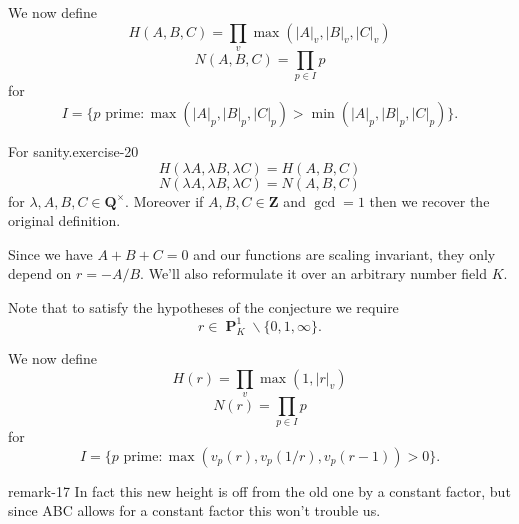 \documentclass[10pt,]{book}
\numberwithin{equation}{section}
\newcommand{\units}{^{\times}}
\newcommand{\ZZ}{\mathbf{Z}}
\newcommand{\QQ}{\mathbf{Q}}
\DeclareMathOperator{\PP}{\mathbf{P}}
\newcommand{\gt}{>}
\begin{document}
\par
\hypertarget{p-674}{}%
We now define%
\begin{equation*}
H(A,B,C) = \prod_{v}\max(|A|_v,|B|_v,|C|_v)
\end{equation*}
%
\begin{equation*}
N(A,B,C) =  \prod_{p\in I} p
\end{equation*}
for%
\begin{equation*}
I = \{p \text{ prime} : \max(|A|_p,|B|_p,|C|_p) \gt \min(|A|_p,|B|_p,|C|_p)\}\text{.}
\end{equation*}
%
\begin{inlineexercise}{For sanity.}{exercise-20}%
\hypertarget{p-675}{}%
%
\begin{equation*}
H(\lambda A,\lambda B,\lambda C)  = H(A,B,C)
\end{equation*}
%
\begin{equation*}
N(\lambda A,\lambda B,\lambda C)  = N(A,B,C)
\end{equation*}
for \(\lambda, A,B,C \in \QQ\units\). Moreover if \(A,B,C \in \ZZ\) and \(\gcd = 1\) then we recover the original definition.%
\end{inlineexercise}
\hypertarget{p-676}{}%
Since we have \(A+ B+C = 0\) and our functions are scaling invariant, they only depend on \(r=  - A/B\). We'll also reformulate it over an arbitrary number field \(K\).%
\par
\hypertarget{p-677}{}%
Note that to satisfy the hypotheses of the conjecture we require%
\begin{equation*}
r \in \PP^1_K \smallsetminus \{0,1,\infty\}\text{.}
\end{equation*}
%
\par
\hypertarget{p-678}{}%
We now define%
\begin{equation*}
H(r) = \prod_{v}\max(1,|r|_v)
\end{equation*}
%
\begin{equation*}
N(r) =  \prod_{p\in I} p
\end{equation*}
for%
\begin{equation*}
I = \{p \text{ prime} : \max(v_p(r), v_p(1/r), v_p(r-1)) \gt 0                      \}\text{.}
\end{equation*}
%
\begin{remark}{}{remark-17}%
\hypertarget{p-679}{}%
In fact this new height is off from the old one by a constant factor, but since ABC allows for a constant factor this won't trouble us.%
\end{remark}
%
%
\typeout{************************************************}
\typeout{************************************************}
%
\end{document}
